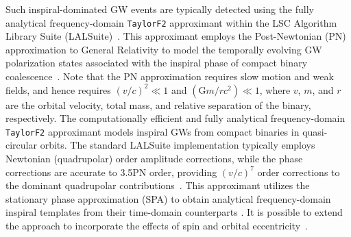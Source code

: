 \documentclass[aps,prd,twocolumn,superscriptaddress,groupedaddress,nofootinbib,showpacs,eqsecnum,useAms]{revtex4-2}
\begin{document}
Such inspiral-dominated GW events are typically detected using the fully analytical frequency-domain \texttt{TaylorF2} approximant within the LSC Algorithm Library Suite (LALSuite)~\cite{BIOPS}. 
This approximant employs the Post-Newtonian (PN) approximation to General Relativity to model the temporally evolving GW polarization states associated with the inspiral 
phase of compact binary coalescence~\cite{LB_LR}.
Note that the PN 
 approximation requires slow motion and weak fields, and hence 
 requires $(v/c)^2 \ll 1 $ and $( \mathrm{G} m/r c^2) \ll 1$, 
where $v$, $m$, and $r$ are 
the orbital velocity, total mass, and relative separation
of the binary, respectively.
The computationally efficient and fully 
 analytical frequency-domain \texttt{TaylorF2} approximant models 
 inspiral GWs from compact binaries in quasi-circular orbits.
 The standard LALSuite implementation typically employs Newtonian (quadrupolar) order 
 amplitude corrections, while the phase corrections are accurate to 3.5PN order, providing $(v/c)^{7}$ order corrections to the dominant quadrupolar contributions~\cite{BIOPS}.
 This approximant utilizes the stationary phase approximation (SPA)
to obtain analytical frequency-domain inspiral templates from their time-domain 
 counterparts \cite{DIS01}.
 It is possible to 
 extend the approach to incorporate the effects of spin and orbital 
 eccentricity~\cite{PW95,THG, Moore2019, Boetzel2019, CTGL21, Paul2023, Henry2023, sridhar2024}. 

\end{document}
